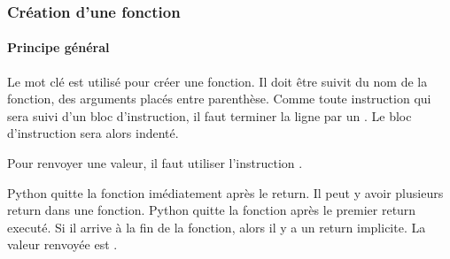 \documentclass[letterpaper,10pt,english]{sphinxhowto}
\begin{document}
\subsubsection{Création d’une fonction}
\label{\detokenize{cours1_fonctions_cours:creation-d-une-fonction}}

\paragraph{Principe général}
\label{\detokenize{cours1_fonctions_cours:principe-general}}
\sphinxAtStartPar
Le mot clé  est utilisé pour créer une fonction. Il doit être suivit du nom de la fonction, des arguments placés entre parenthèse. Comme toute instruction qui sera suivi d’un bloc d’instruction, il faut terminer la ligne par un \sphinxcode{\sphinxupquote{:}}. Le bloc d’instruction sera alors indenté.

\begin{sphinxVerbatim}[commandchars=\\\{\}]
 
    
\end{sphinxVerbatim}

\sphinxAtStartPar
Pour renvoyer une valeur, il faut utiliser l’instruction .

\begin{sphinxVerbatim}[commandchars=\\\{\}]
   

 
     

\end{sphinxVerbatim}

\sphinxAtStartPar
Python quitte la fonction imédiatement après le return. Il peut y avoir plusieurs return dans une fonction. Python quitte la fonction après le premier return executé. Si il arrive à la fin de la fonction, alors il y a un return implicite. La valeur renvoyée est .
\end{document}
